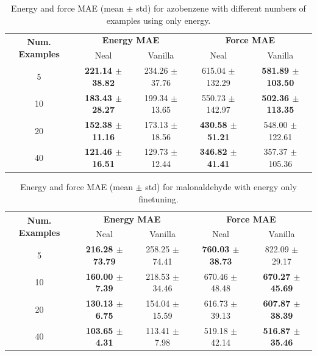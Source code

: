 \documentclass[12pt]{article}
\theoremstyle{definition}
\theoremstyle{remark}
\begin{document}
\begin{table}[ht]
\centering
\label{tab:azobenzene_energy_force_mae}
\begin{tabular}{c|cc|cc}
\hline
\multirow{2}{*}{\textbf{Num. Examples}} 
& \multicolumn{2}{c|}{\textbf{Energy MAE}} 
& \multicolumn{2}{c}{\textbf{Force MAE}} \\
& Neal & Vanilla & Neal & Vanilla \\
\hline
5  & \textbf{221.14 $\pm$ 38.82} & 234.26 $\pm$ 37.76
   & 615.04 $\pm$ 132.29 & \textbf{581.89 $\pm$ 103.50} \\

10 & \textbf{183.43 $\pm$ 28.27} & 199.34 $\pm$ 13.65
   & 550.73 $\pm$ 142.97 & \textbf{502.36 $\pm$ 113.35} \\

20 & \textbf{152.38 $\pm$ 11.16} & 173.13 $\pm$ 18.56
   & \textbf{430.58 $\pm$ 51.21} & 548.00 $\pm$ 122.61 \\

40 & \textbf{121.46 $\pm$ 16.51} & 129.73 $\pm$ 12.44
   & \textbf{346.82 $\pm$ 41.41} & 357.37 $\pm$ 105.36 \\
\hline
\end{tabular}
\caption{Energy and force MAE (mean $\pm$ std) for azobenzene with different numbers of examples using only energy.}
\end{table}

\begin{table}[ht]
\centering
\begin{tabular}{c|cc|cc}
\hline
\multirow{2}{*}{\textbf{Num. Examples}} 
& \multicolumn{2}{c|}{\textbf{Energy MAE}} 
& \multicolumn{2}{c}{\textbf{Force MAE}} \\
& Neal & Vanilla & Neal & Vanilla \\
\hline
5  & \textbf{216.28 $\pm$ 73.79} & 258.25 $\pm$ 74.41
   & \textbf{760.03 $\pm$ 38.73} & 822.09 $\pm$ 29.17 \\

10 & \textbf{160.00 $\pm$ 7.39} & 218.53 $\pm$ 34.46
   & 670.46 $\pm$ 48.48 & \textbf{670.27 $\pm$ 45.69} \\

20 & \textbf{130.13 $\pm$ 6.75} & 154.04 $\pm$ 15.59
   & 616.73 $\pm$ 39.13 & \textbf{607.87 $\pm$ 38.39} \\

40 & \textbf{103.65 $\pm$ 4.31} & 113.41 $\pm$ 7.98
   & 519.18 $\pm$ 42.14 & \textbf{516.87 $\pm$ 35.46} \\
\hline
\end{tabular}
\caption{Energy and force MAE (mean $\pm$ std) for malonaldehyde with energy only finetuning.
}
\label{tab:malonaldehyde_energy_force_mae}
\end{table}
\end{document}
